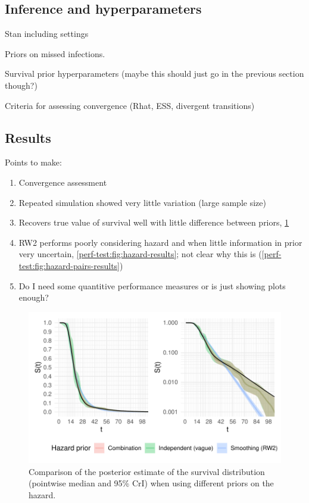 \documentclass[thesis.tex]{subfiles}
\begin{document}
\subsection{Inference and hyperparameters}

Stan including settings

Priors on missed infections.

Survival prior hyperparameters (maybe this should just go in the previous section though?)

Criteria for assessing convergence (Rhat, ESS, divergent transitions)

\subsection{Results}

Points to make:

\begin{enumerate}
  \item Convergence assessment
  \item Repeated simulation showed very little variation (large sample size)
  \item Recovers true value of survival well with little difference between priors, \cref{perf-test:fig:survival-results}
  \item RW2 performs poorly considering hazard and when little information in prior very uncertain, \cref{perf-test:fig:hazard-results}; not clear why this is (\cref{perf-test:fig:hazard-pairs-results})
  \item Do I need some quantitive performance measures or is just showing plots enough?
\end{enumerate}

\begin{figure}
  \centering \includegraphics{cis-perfect-testing/survival-results}
  \caption{Comparison of the posterior estimate of the survival distribution (pointwise median and 95\% CrI) when using different priors on the hazard. \label{perf-test:fig:survival-results}}
\end{figure}
\end{document}
